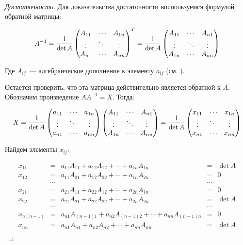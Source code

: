 \begin{proof}[Достаточность]
	Для доказательства достаточности воспользуемся формулой обратной
	матрицы:

	$$
	A^{-1}=
	\frac1{\det A}\begin{pmatrix}
	A_{11} & \cdots & A_{1n} \\
	\vdots & \ddots & \vdots \\
	A_{n1} & \cdots & A_{nn}\end{pmatrix}^T=
	\frac1{\det A}\begin{pmatrix}
	A_{11} & \cdots & A_{n1} \\
	\vdots & \ddots & \vdots \\
	A_{1n} & \cdots & A_{nn}\end{pmatrix}
	$$

	Где $A_{ij}$~--- алгебраическое дополнение к элементу $a_{ij}$ (см.
	).

	Остается проверить, что эта матрица действительно является обратной
	к $A$. Обозначим произведение $AA^{-1}=X$. Тогда:

	$$
	X=\frac1{\det A}
	\begin{pmatrix}
	a_{11} & \cdots & a_{1n} \\
	\vdots & \ddots & \vdots \\
	a_{n1} & \cdots & a_{nn}
	\end{pmatrix}
	\begin{pmatrix}
	A_{11} & \cdots & A_{n1} \\
	\vdots & \ddots & \vdots \\
	A_{1n} & \cdots & A_{nn}
	\end{pmatrix}
	=
	\frac1{\det A}
	\begin{pmatrix}
	x_{11} & \cdots & x_{1n} \\
	\vdots & \ddots & \vdots \\
	x_{n1} & \cdots & x_{nn}
	\end{pmatrix}
	$$

	Найдем элементы $x_{ij}$:

	$$
	\begin{array}{rclcl}
		x_{11}&=&a_{11}A_{11}+a_{12}A_{12}+\cdots+a_{1n}A_{1n}&=&\det A \\
		x_{12}&=&a_{11}A_{21}+a_{12}A_{22}+\cdots+a_{1n}A_{2n}&=&0 \\
		&\cdots&&\cdots& \\
		x_{21}&=&a_{21}A_{11}+a_{22}A_{12}+\cdots+a_{2n}A_{1n}&=&0 \\
		x_{22}&=&a_{21}A_{21}+a_{22}A_{22}+\cdots+a_{2n}A_{2n}&=&\det A \\
		&\cdots&&\cdots& \\
		x_{n(n-1)}&=&a_{n1}A_{(n-1)1}+a_{n2}A_{(n-1)2}+\cdots+a_{nn}A_{(n-1)n}&=&0 \\
		x_{nn}    &=&a_{n1}A_{n    1}+a_{n2}A_{n    2}+\cdots+a_{nn}A_{n    n}&=&\det A \\
	\end{array}
	$$


\end{proof}
